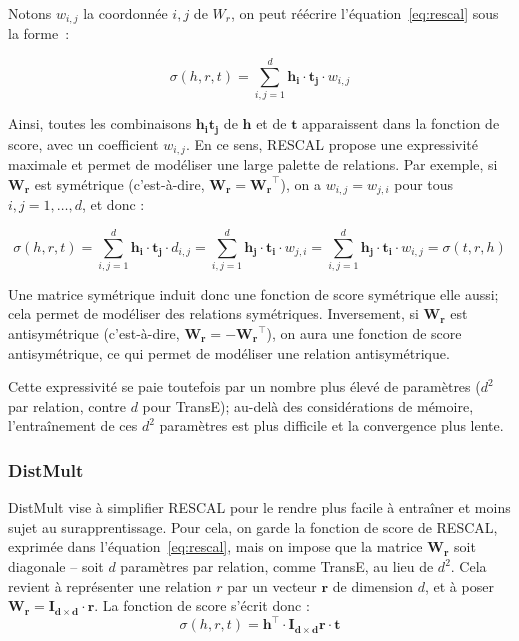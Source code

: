 Notons $w_{i, j}$ la coordonnée $i,j$ de $W_r$, on peut réécrire l'équation~\ref{eq:rescal} sous la forme~:

\begin{equation}
    \sigma(h, r, t) = \sum_{i, j = 1}^{d} \mathbf{h_i \cdot t_j} \cdot w_{i, j}
\end{equation}

Ainsi, toutes les combinaisons $\mathbf{h_i t_j}$ de $\mathbf{h}$ et de $\mathbf{t}$ apparaissent dans la fonction de score, avec un coefficient $w_{i, j}$. En ce sens, RESCAL propose une expressivité maximale et permet de modéliser une large palette de relations. Par exemple, si $\mathbf{W_r}$ est symétrique (c'est-à-dire, $\mathbf{W_r} = \mathbf{W_r}^\top$), on a $w_{i,j} = w_{j, i}$ pour tous $i, j = 1, \ldots, d$, et donc :

\begin{equation}
    \sigma(h, r, t) = \sum_{i, j = 1}^{d} \mathbf{h_i \cdot t_j} \cdot d_{i, j}
    =  \sum_{i, j = 1}^{d} \mathbf{h_j \cdot t_i} \cdot w_{j, i}
    =  \sum_{i, j = 1}^{d} \mathbf{h_j \cdot t_i} \cdot w_{i, j}
    = \sigma(t, r, h)
\end{equation}

Une matrice symétrique induit donc une fonction de score symétrique elle aussi; cela permet de modéliser des relations symétriques. Inversement, si $\mathbf{W_r}$ est antisymétrique (c'est-à-dire, $\mathbf{W_r} = -\mathbf{W_r}^\top$), on aura une fonction de score antisymétrique, ce qui permet de modéliser une relation antisymétrique.

Cette expressivité se paie toutefois par un nombre plus élevé de paramètres ($d^2$ par relation, contre $d$ pour TransE); au-delà des considérations de mémoire, l'entraînement de ces $d^2$ paramètres est plus difficile et la convergence plus lente.

\subsubsection{DistMult}

DistMult \cite{distmult} vise à simplifier RESCAL pour le rendre plus facile à entraîner et moins sujet au surapprentissage. Pour cela, on garde la fonction de score de RESCAL, exprimée dans l'équation~\ref{eq:rescal}, mais on impose que la matrice $\mathbf{W_r}$ soit diagonale – soit $d$ paramètres par relation, comme TransE, au lieu de $d^2$. Cela revient à représenter une relation $r$ par un vecteur $\mathbf{r}$ de dimension $d$, et à poser $\mathbf{W_r = I_{d\times d} \cdot r}$. La fonction de score s'écrit donc :
\begin{equation}
    \label{eq:distmult}
    \sigma(h, r, t) = \mathbf{h^\top \cdot I_{d\times d}r \cdot t}
\end{equation}

